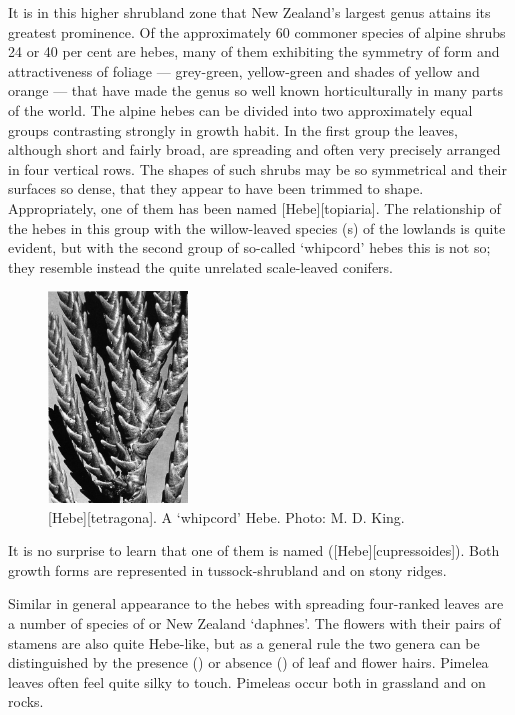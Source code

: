 It is in this higher shrubland zone that New Zealand's largest genus  attains its greatest prominence.
Of the approximately 60 commoner species of alpine shrubs 24 or 40 per cent are hebes, many of them exhibiting the symmetry of form and attractiveness of foliage --- grey-green, yellow-green and shades of yellow and orange --- that have made the genus so well known horticulturally in many parts of the world.
The alpine hebes can be divided into two approximately equal groups contrasting strongly in growth habit.
In the first group the leaves, although short and fairly broad, are spreading and often very precisely arranged in four vertical rows.
The shapes of such shrubs may be so symmetrical and their surfaces so dense, that they appear to have been trimmed to shape.
Appropriately, one of them has been named [Hebe][topiaria].
The relationship of the hebes in this group with the willow-leaved species (s) of the lowlands is quite evident, but with the second group of so-called `whipcord' hebes this is not so; they resemble instead the quite unrelated scale-leaved conifers.
\begin{figure}
	\includegraphics[width=0.33\textwidth]{graphics/figure93hebe.jpg}
	\centering
	\caption[\emph{Hebe tetragona}]{[Hebe][tetragona].
	A `whipcord' Hebe.
	Photo: M. D. King.}%
	\label{fig:93hebe}
\end{figure}
It is no surprise to learn that one of them is named  ([Hebe][cupressoides]).
Both growth forms are represented in tussock-shrubland and on stony ridges.

Similar in general appearance to the hebes with spreading four-ranked leaves are a number of species of  or New Zealand `daphnes'.
The flowers with their pairs of stamens are also quite Hebe-like, but as a general rule the two genera can be distinguished by the presence () or absence () of leaf and flower hairs.
Pimelea leaves often feel quite silky to touch.
Pimeleas occur both in grassland and on rocks.

